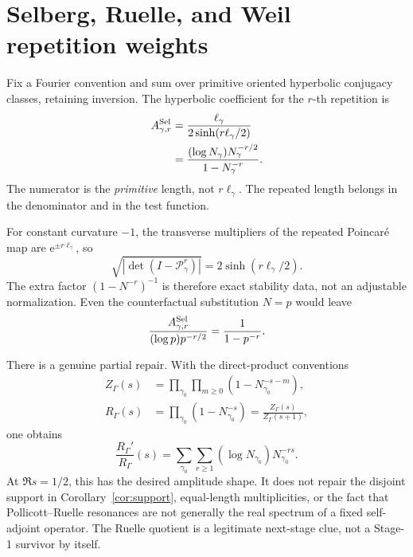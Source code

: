 \documentclass[11pt]{article}
\theoremstyle{definition}
\theoremstyle{remark}
\newcommand{\e}{\mathrm{e}}
\begin{document}
\section{Selberg, Ruelle, and Weil repetition weights}
\label{sec:weights}

Fix a Fourier convention and sum over primitive oriented hyperbolic conjugacy
classes, retaining inversion.  The hyperbolic coefficient for the \(r\)-th
repetition is \citep{Selberg1956,Hejhal1983,Stromberg2012,MageeNaudPuder2022}
\begin{align}
 A^{\rm Sel}_{\gamma,r}
 &=\frac{\ell_\gamma}{2\sinh(r\ell_\gamma/2)} \\
 &=\frac{(\log N_\gamma)N_\gamma^{-r/2}}
 {1-N_\gamma^{-r}}.
 \label{eq:selweight}
\end{align}
The numerator is the \emph{primitive} length, not \(r\ell_\gamma\).  The
repeated length belongs in the denominator and in the test function.

For constant curvature \(-1\), the transverse multipliers of the repeated
Poincar\'e map are \(\e^{\pm r\ell_\gamma}\), so
\begin{equation}
 \sqrt{\left|\det(I-\mathcal P_\gamma^r)\right|}
 =2\sinh(r\ell_\gamma/2).
 \label{eq:monodromy}
\end{equation}
The extra factor \((1-N^{-r})^{-1}\) is therefore exact stability data, not an
adjustable normalization.  Even the counterfactual substitution \(N=p\)
would leave
\[
 \frac{A^{\rm Sel}_{\gamma,r}}
 { (\log p)p^{-r/2}}=\frac{1}{1-p^{-r}}.
\]

There is a genuine partial repair.  With the direct-product conventions
\begin{align}
 Z_\Gamma(s)&=\prod_{\gamma_0}\prod_{m\ge0}
 (1-N_{\gamma_0}^{-s-m}),\\
 R_\Gamma(s)&=\prod_{\gamma_0}(1-N_{\gamma_0}^{-s})
 =\frac{Z_\Gamma(s)}{Z_\Gamma(s+1)},
\end{align}
one obtains \citep{Fried1986}
\begin{equation}
 \frac{R_\Gamma'}{R_\Gamma}(s)
 =\sum_{\gamma_0}\sum_{r\ge1}
 (\log N_{\gamma_0})N_{\gamma_0}^{-rs}.
 \label{eq:ruelleweight}
\end{equation}
At \(\Re s=1/2\), this has the desired amplitude shape.  It does not repair
the disjoint support in Corollary~\ref{cor:support}, equal-length
multiplicities, or the fact that Pollicott--Ruelle resonances are not generally
the real spectrum of a fixed self-adjoint operator.  The Ruelle quotient is a
legitimate next-stage clue, not a Stage-1 survivor by itself.
\end{document}

